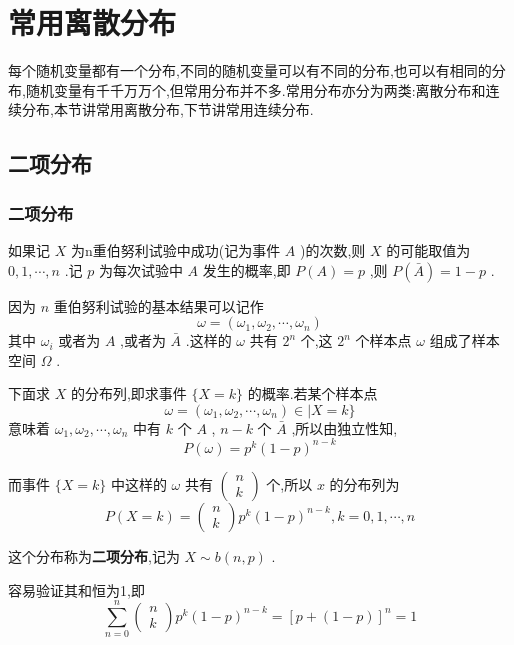 \section{常用离散分布}\label{sec:2.4}

每个随机变量都有一个分布,不同的随机变量可以有不同的分布,也可以有相同的分布,随机变量有千千万万个,但常用分布并不多.常用分布亦分为两类:离散分布和连续分布,本节讲常用离散分布,下节讲常用连续分布.

\subsection{二项分布}\label{ssec:2.4.1}

\subsubsection{二项分布}

如果记 $ X $ 为n重伯努利试验中成功(记为事件 $ A $ )的次数,则 $ X $ 的可能取值为 $ 0,1, \cdots, n $ .记 $ p $ 为每次试验中 $ A $ 发生的概率,即 $ P(A)=p $ ,则 $ P(\bar{A})=1-p $ .

因为 $ n $ 重伯努利试验的基本结果可以记作
\[
\omega=\left(\omega_{1}, \omega_{2}, \cdots, \omega_{n}\right)
\]
其中 $ \omega_{i} $ 或者为 $ A $ ,或者为 $ \bar{A} $ .这样的 $ \omega $ 共有 $ 2^{n} $ 个,这 $ 2^{n} $ 个样本点 $ \omega $ 组成了样本空间 $ \Omega $ .

下面求 $ X $ 的分布列,即求事件 $ \{X=k\} $ 的概率.若某个样本点
\[
\omega=\left(\omega_{1}, \omega_{2}, \cdots, \omega_{n}\right) \in | X=k \}
\]
意味着 $ \omega_{1}, \omega_{2}, \cdots, \omega_{n} $ 中有 $ k $ 个 $ A $ , $ n-k $ 个 $ \bar{A} $ ,所以由独立性知,
\[
P(\omega)=p^{k}(1-p)^{n-k}
\]

而事件 $ \{X=k\} $ 中这样的 $ \omega $ 共有 $ \left( \begin{array}{l}{n} \\ {k}\end{array}\right) $ 个,所以 $ x $ 的分布列为
\begin{equation}
P(X=k)=\left( \begin{array}{l}{n} \\ {k}\end{array}\right) p^{k}(1-p)^{n-k}, k=0,1, \cdots, n \label{eq:2.4.1}
\end{equation}

这个分布称为\textbf{二项分布},记为 $ X \sim b(n, p) $ .

容易验证其和恒为1,即
\[
\sum_{n=0}^{n} \left( \begin{array}{l}{n} \\ {k}\end{array}\right) p^{k}(1-p)^{n-k}=[p+(1-p)]^{n}=1
\]

